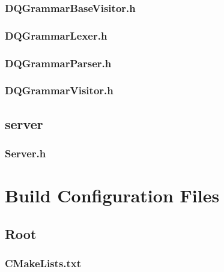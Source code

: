\subsubsection*{DQGrammarBaseVisitor.h}


\subsubsection*{DQGrammarLexer.h}


\subsubsection*{DQGrammarParser.h}


\subsubsection*{DQGrammarVisitor.h}


\subsection*{server}

\subsubsection*{Server.h}


\section{Build Configuration Files}

\subsection*{Root}

\subsubsection*{CMakeLists.txt}


